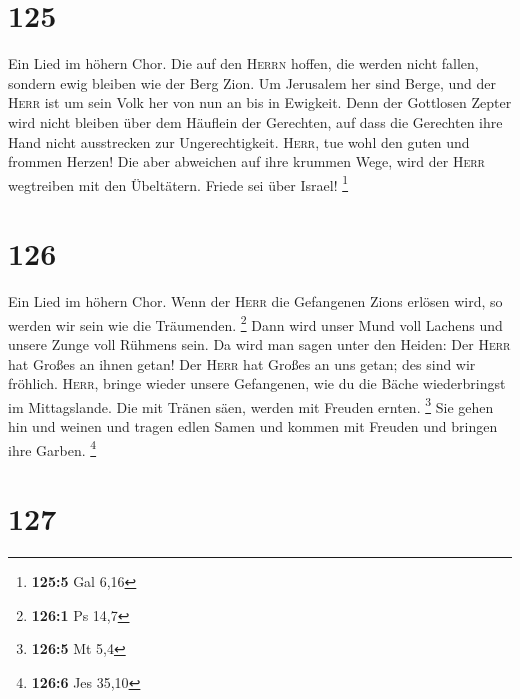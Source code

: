 \hypertarget{section-39}{%
\section{125}\label{section-39}}

 Ein Lied im höhern Chor. Die auf den \textsc{Herrn}
hoffen, die werden nicht fallen, sondern ewig bleiben wie der Berg Zion.
 Um Jerusalem her sind Berge, und der \textsc{Herr} ist um
sein Volk her von nun an bis in Ewigkeit.  Denn der
Gottlosen Zepter wird nicht bleiben über dem Häuflein der Gerechten, auf
dass die Gerechten ihre Hand nicht ausstrecken zur Ungerechtigkeit.
 \textsc{Herr}, tue wohl den guten und frommen Herzen!
 Die aber abweichen auf ihre krummen Wege, wird der
\textsc{Herr} wegtreiben mit den Übeltätern. Friede sei über Israel!
\footnote{\textbf{125:5} Gal 6,16}

\hypertarget{section-40}{%
\section{126}\label{section-40}}

 Ein Lied im höhern Chor. Wenn der \textsc{Herr} die
Gefangenen Zions erlösen wird, so werden wir sein wie die Träumenden.
\footnote{\textbf{126:1} Ps 14,7}  Dann wird unser Mund
voll Lachens und unsere Zunge voll Rühmens sein. Da wird man sagen unter
den Heiden: Der \textsc{Herr} hat Großes an ihnen getan! 
Der \textsc{Herr} hat Großes an uns getan; des sind wir fröhlich.
 \textsc{Herr}, bringe wieder unsere Gefangenen, wie du
die Bäche wiederbringst im Mittagslande.  Die mit Tränen
säen, werden mit Freuden ernten. \footnote{\textbf{126:5} Mt 5,4}
 Sie gehen hin und weinen und tragen edlen Samen und
kommen mit Freuden und bringen ihre Garben. \footnote{\textbf{126:6} Jes
  35,10}

\hypertarget{section-41}{%
\section{127}\label{section-41}}

